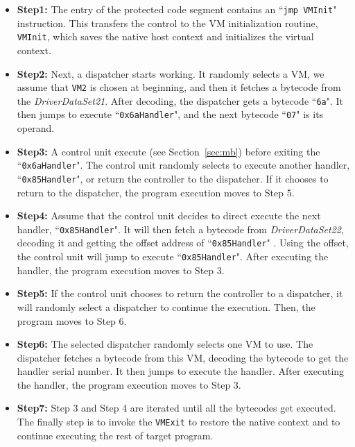 \documentclass[times]{secauth}
\begin{document}
\begin{itemize}
\item \textbf{Step1:} The entry of the protected code segment contains an ``\texttt{jmp VMInit}" instruction. This transfers the control to the VM initialization routine, \texttt{VMInit}, which saves the native host context and initializes the virtual context.
\item \textbf{Step2:} Next, a dispatcher starts working. It randomly selects a VM, we assume that \texttt{VM2} is chosen at beginning, and then it fetches a bytecode from the \emph{DriverDataSet21}. After decoding, the dispatcher gets a bytecode ``\texttt{6a}". It then jumps to execute ``\texttt{0x6aHandler}", and the next bytecode ``\texttt{07}" is its operand.
\item \textbf{Step3:} A control unit execute (see Section~\ref{sec:mb}) before exiting the ``\texttt{0x6aHandler}". The control unit randomly selects to execute another handler, ``\texttt{0x85Handler}", or return the controller to the dispatcher. If it chooses to return to the dispatcher, the program execution moves to Step 5.
\item \textbf{Step4:} Assume that the control unit decides to direct execute the next handler, ``\texttt{0x85Handler}". It will then fetch a bytecode from \emph{DriverDataSet22}, decoding it and getting the offset address of ``\texttt{0x85Handler}" . Using the offset, the control unit will jump to execute ``\texttt{0x85Handler}". After executing the handler, the program execution moves to Step 3.
\item \textbf{Step5:} If the control unit chooses to return the controller to a dispatcher, it will randomly select a dispatcher to continue the execution. Then, the program moves to Step 6.
\item \textbf{Step6:} The selected dispatcher randomly selects one VM to use. The dispatcher fetches a bytecode from this VM, decoding the bytecode to get the handler serial number.
    It then jumps to execute the handler. After executing the handler, the program execution moves to Step 3.
\item \textbf{Step7:} Step 3 and Step 4 are iterated until all the bytecodes get executed. The finally step is to invoke the \texttt{VMExit} to restore the native context and to continue executing the rest of target program.
\end{itemize}
\end{document}
